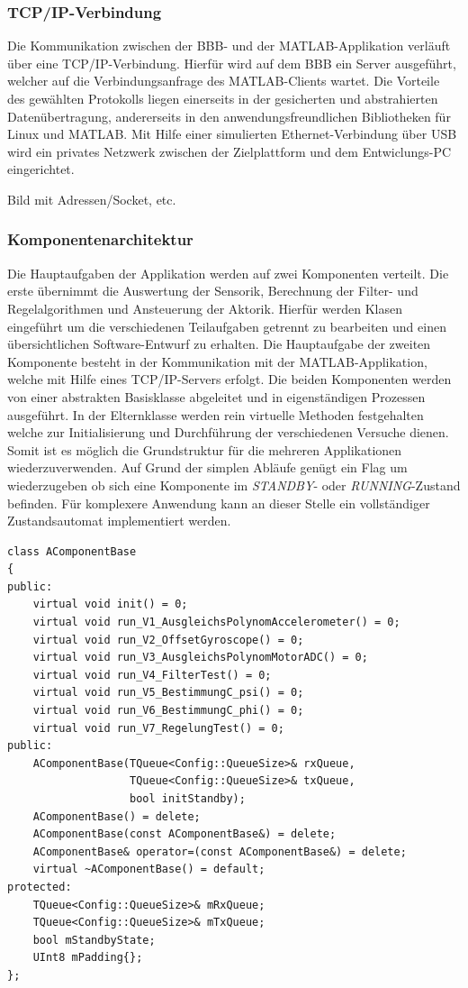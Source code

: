 \subsubsection{TCP/IP-Verbindung}
Die Kommunikation zwischen der \ac{BBB}- und der MATLAB-Applikation verläuft über eine TCP/IP-Verbindung. Hierfür wird auf dem \ac{BBB} ein Server ausgeführt, welcher auf die Verbindungsanfrage des MATLAB-Clients wartet. Die Vorteile des gewählten Protokolls liegen einerseits in der gesicherten und abstrahierten Datenübertragung, andererseits in den anwendungsfreundlichen Bibliotheken für Linux und MATLAB. Mit Hilfe einer simulierten Ethernet-Verbindung über USB wird ein privates Netzwerk zwischen der Zielplattform und dem Entwiclungs-PC eingerichtet.

Bild mit Adressen/Socket, etc.

\subsubsection{Komponentenarchitektur}
Die Hauptaufgaben der Applikation werden auf zwei Komponenten verteilt. Die erste übernimmt die Auswertung der Sensorik, Berechnung der Filter- und Regelalgorithmen und Ansteuerung der Aktorik. Hierfür werden Klasen eingeführt um die verschiedenen Teilaufgaben getrennt zu bearbeiten und einen übersichtlichen Software-Entwurf zu erhalten. Die Hauptaufgabe der zweiten Komponente besteht in der Kommunikation mit der MATLAB-Applikation, welche mit Hilfe eines TCP/IP-Servers erfolgt. 
Die beiden Komponenten werden von einer abstrakten Basisklasse abgeleitet und in eigenständigen Prozessen ausgeführt. In der Elternklasse werden rein virtuelle Methoden festgehalten welche zur Initialisierung und Durchführung der verschiedenen Versuche dienen. Somit ist es möglich die Grundstruktur für die mehreren Applikationen wiederzuverwenden. Auf Grund der simplen Abläufe genügt ein Flag um wiederzugeben ob sich eine Komponente im \textit{STANDBY}- oder \textit{RUNNING}-Zustand befinden. Für komplexere Anwendung kann an dieser Stelle ein vollständiger Zustandsautomat implementiert werden.

\begin{lstlisting}
class AComponentBase
{
public:
	virtual void init() = 0;
	virtual void run_V1_AusgleichsPolynomAccelerometer() = 0;
	virtual void run_V2_OffsetGyroscope() = 0;
	virtual void run_V3_AusgleichsPolynomMotorADC() = 0;
	virtual void run_V4_FilterTest() = 0;
	virtual void run_V5_BestimmungC_psi() = 0;
	virtual void run_V6_BestimmungC_phi() = 0;
	virtual void run_V7_RegelungTest() = 0;
public:
	AComponentBase(TQueue<Config::QueueSize>& rxQueue,
				   TQueue<Config::QueueSize>& txQueue,
				   bool initStandby);
	AComponentBase() = delete;
	AComponentBase(const AComponentBase&) = delete;
	AComponentBase& operator=(const AComponentBase&) = delete;
	virtual ~AComponentBase() = default;
protected:
	TQueue<Config::QueueSize>& mRxQueue;
	TQueue<Config::QueueSize>& mTxQueue;
	bool mStandbyState;
	UInt8 mPadding{};
};

\end{lstlisting}


